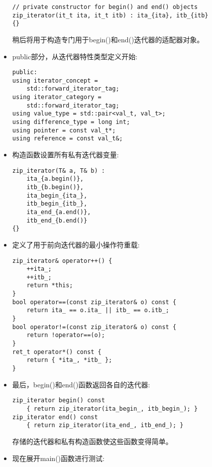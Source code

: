 \begin{itemize}
\begin{lstlisting}[style=styleCXX]
// private constructor for begin() and end() objects
zip_iterator(it_t ita, it_t itb) : ita_{ita}, itb_{itb}
{}
\end{lstlisting}

稍后将用于构造专门用于begin()和end()迭代器的适配器对象。

\item 
public部分，从迭代器特性类型定义开始:

\begin{lstlisting}[style=styleCXX]
public:
using iterator_concept =
	std::forward_iterator_tag;
using iterator_category =
	std::forward_iterator_tag;
using value_type = std::pair<val_t, val_t>;
using difference_type = long int;
using pointer = const val_t*;
using reference = const val_t&;
\end{lstlisting}

\item 
构造函数设置所有私有迭代器变量:

\begin{lstlisting}[style=styleCXX]
zip_iterator(T& a, T& b) :
	ita_{a.begin()},
	itb_{b.begin()},
	ita_begin_{ita_},
	itb_begin_{itb_},
	ita_end_{a.end()},
	itb_end_{b.end()}
{}
\end{lstlisting}

\item 
定义了用于前向迭代器的最小操作符重载:

\begin{lstlisting}[style=styleCXX]
zip_iterator& operator++() {
	++ita_;
	++itb_;
	return *this;
}
bool operator==(const zip_iterator& o) const {
	return ita_ == o.ita_ || itb_ == o.itb_;
}
bool operator!=(const zip_iterator& o) const {
	return !operator==(o);
}
ret_t operator*() const {
	return { *ita_, *itb_ };
}
\end{lstlisting}

\item 
最后，begin()和end()函数返回各自的迭代器:

\begin{lstlisting}[style=styleCXX]
zip_iterator begin() const
	{ return zip_iterator(ita_begin_, itb_begin_); }
zip_iterator end() const
	{ return zip_iterator(ita_end_, itb_end_); }
\end{lstlisting}

存储的迭代器和私有构造函数使这些函数变得简单。

\item 
现在展开main()函数进行测试:


\end{itemize}
